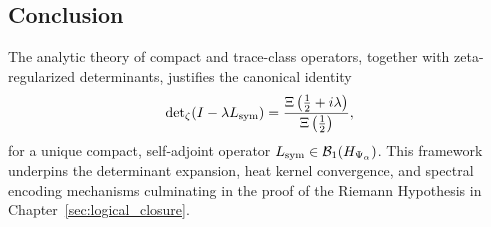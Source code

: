 \subsection*{Conclusion}

The analytic theory of compact and trace-class operators, together with zeta-regularized determinants, justifies the canonical identity
\[
\det\nolimits_\zeta(I - \lambda L_{\mathrm{sym}}) = \frac{\Xi\left(\tfrac{1}{2} + i\lambda\right)}{\Xi\left(\tfrac{1}{2}\right)},
\]
for a unique compact, self-adjoint operator \( L_{\mathrm{sym}} \in \mathcal{B}_1(H_{\Psi_\alpha}) \). This framework underpins the determinant expansion, heat kernel convergence, and spectral encoding mechanisms culminating in the proof of the Riemann Hypothesis in Chapter~\ref{sec:logical_closure}.
